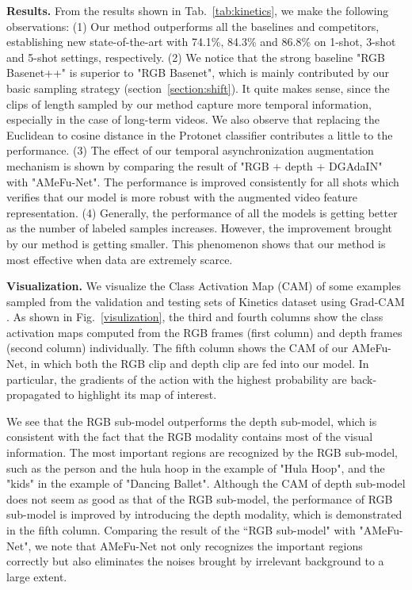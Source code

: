 \documentclass[sigconf]{acmart}
\begin{document}
	\noindent\textbf{Results.} 
	From the results shown in Tab.~\ref{tab:kinetics}, we make the following observations:
	(1) Our method outperforms all the baselines and competitors, establishing new state-of-the-art with 74.1\%, 84.3\% and 86.8\% on 1-shot, 3-shot and 5-shot settings, respectively. (2) We notice that the strong baseline "RGB Basenet++" is superior to "RGB Basenet", which is mainly contributed by our basic sampling strategy (section~\ref{section:shift}). 
	It quite makes sense, since the clips of length  sampled by our method capture more temporal information, especially in the case of long-term videos. 
	We also observe that replacing the Euclidean to cosine distance in the Protonet classifier contributes a little to the performance.
	(3) The effect of our temporal asynchronization augmentation mechanism is shown by comparing the result of "RGB + depth + DGAdaIN" with "AMeFu-Net".
	 The performance is improved consistently for all shots which verifies that our model is more robust with the augmented video feature representation.
	(4) Generally, the performance of all the models is getting better as the number of labeled samples increases. However, the improvement brought by our method is getting smaller. This phenomenon shows that our method is most effective when data are extremely scarce. 
	
	
	
	
	\noindent\textbf{Visualization.} We visualize the Class Activation Map (CAM) \cite{zhou2016learning} of some examples sampled from the validation and testing sets of Kinetics dataset using Grad-CAM \cite{selvaraju2017grad}. As shown in Fig.~\ref{visulization}, the third and fourth columns show the class activation maps computed from the RGB frames (first column) and depth frames (second column) individually. The fifth column shows the CAM of our AMeFu-Net, in which both the RGB clip and depth clip are fed into our model. In particular, the gradients of the action with the highest probability are back-propagated to highlight its map of interest. 
	
	We see that the RGB sub-model outperforms the depth sub-model, which is consistent with the fact that the RGB modality contains most of the visual information. The most important regions are recognized by the RGB sub-model, such as the person and the hula hoop in the example of "Hula Hoop", and the "kids" in the example of "Dancing Ballet". Although the CAM of depth sub-model does not seem as good as that of the RGB sub-model, the performance of RGB sub-model is improved by introducing the depth modality, which is demonstrated in the fifth column. Comparing the result of the “RGB sub-model" with "AMeFu-Net", we note that AMeFu-Net not only recognizes the important regions correctly but also eliminates the noises brought by irrelevant background to a large extent. 
	
\end{document}
